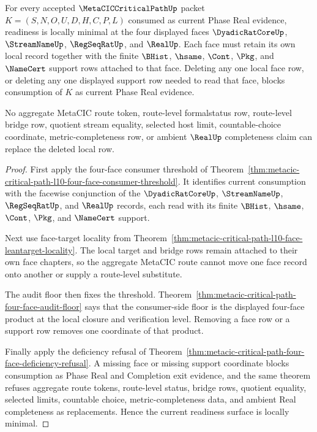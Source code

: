 \begin{theorem}
\label{thm:metacic-critical-path-l10-readiness-local-minimality}
For every accepted $\MetaCICCriticalPathUp$ packet $K=(S,N,O,U,D,H,C,P,L)$ consumed as current Phase Real evidence, readiness is locally minimal at the four displayed faces $\DyadicRatCoreUp$, $\StreamNameUp$, $\RegSeqRatUp$, and $\RealUp$. Each face must retain its own local record together with the finite $\BHist$, $\hsame$, $\Cont$, $\Pkg$, and $\NameCert$ support rows attached to that face. Deleting any one local face row, or deleting any one displayed support row needed to read that face, blocks consumption of $K$ as current Phase Real evidence.

No aggregate MetaCIC route token, route-level formalstatus row, route-level bridge row, quotient stream equality, selected host limit, countable-choice coordinate, metric-completeness row, or ambient $\RealUp$ completeness claim can replace the deleted local row.
\end{theorem}
\begin{proof}
First apply the four-face consumer threshold of Theorem~\ref{thm:metacic-critical-path-l10-four-face-consumer-threshold}. It identifies current consumption with the facewise conjunction of the $\DyadicRatCoreUp$, $\StreamNameUp$, $\RegSeqRatUp$, and $\RealUp$ records, each read with its finite $\BHist$, $\hsame$, $\Cont$, $\Pkg$, and $\NameCert$ support.

Next use face-target locality from Theorem~\ref{thm:metacic-critical-path-l10-face-leantarget-locality}. The local target and bridge rows remain attached to their own face chapters, so the aggregate MetaCIC route cannot move one face record onto another or supply a route-level substitute.

The audit floor then fixes the threshold. Theorem~\ref{thm:metacic-critical-path-four-face-audit-floor} says that the consumer-side floor is the displayed four-face product at the local closure and verification level. Removing a face row or a support row removes one coordinate of that product.

Finally apply the deficiency refusal of Theorem~\ref{thm:metacic-critical-path-four-face-deficiency-refusal}. A missing face or missing support coordinate blocks consumption as Phase Real and Completion exit evidence, and the same theorem refuses aggregate route tokens, route-level status, bridge rows, quotient equality, selected limits, countable choice, metric-completeness data, and ambient Real completeness as replacements. Hence the current readiness surface is locally minimal.
\end{proof}

